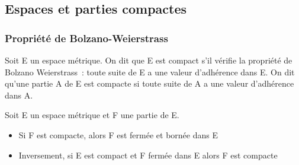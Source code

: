 \subsection{Espaces et parties compactes}
%
\subsubsection{Propriété de Bolzano-Weierstrass}

\begin{de}[Compacité]
	Soit E un espace métrique. On dit que E est compact
	s'il vérifie la propriété de Bolzano Weierstrass~: toute suite de E a
	une valeur d'adhérence dans E. On dit qu'une partie A de E est compacte
	si toute suite de A a une valeur d'adhérence dans A.
\end{de}
%
\begin{thm}
	Soit E un espace métrique et F une partie de E.
	\begin{itemize}
		\item Si F est compacte, alors F est fermée et bornée dans E
		\item Inversement, si E
			est compact et F fermée dans E alors F est compacte
	\end{itemize}

\end{thm}
%
%
